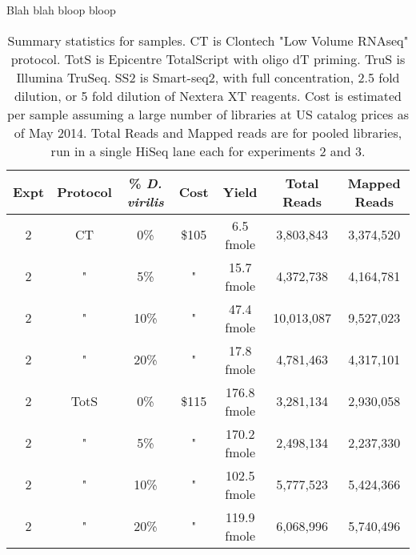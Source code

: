 Blah blah bloop bloop

\begin{table}[htdp]
\caption{Summary statistics for samples. CT is Clontech "Low Volume RNAseq" protocol. TotS is Epicentre TotalScript with oligo dT priming. TruS is Illumina TruSeq. SS2 is Smart-seq2, with full concentration, 2.5 fold dilution, or 5 fold dilution of Nextera XT reagents. Cost is estimated per sample assuming a
     large number of libraries at US catalog prices as of May 2014. Total Reads
     and Mapped reads are for pooled libraries, run in a single HiSeq lane each
     for experiments 2 and 3. }
\begin{center}
\begin{tabular}{|c|c|c|c|c|c|c|} \hline
      Expt & Protocol & \% {\em D. virilis} & Cost &  Yield & Total Reads & Mapped Reads \\\hline 
2 & CT & 0\% & \$105 & 6.5 fmole & 3,803,843 &3,374,520 \\
2 & " & 5\% & " & 15.7 fmole & 4,372,738 &4,164,781 \\
2 & " & 10\% & " & 47.4 fmole & 10,013,087 &9,527,023 \\
2 & " & 20\% & " & 17.8 fmole & 4,781,463 &4,317,101 \\
2 & TotS & 0\% & \$115 & 176.8 fmole & 3,281,134 &2,930,058 \\
2 & " & 5\% & " & 170.2 fmole & 2,498,134 &2,237,330 \\
2 & " & 10\% & " & 102.5 fmole & 5,777,523 &5,424,366 \\
2 & " & 20\% & " & 119.9 fmole & 6,068,996 &5,740,496 \\

\end{tabular}
\end{center}
\end{table}
